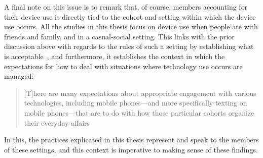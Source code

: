 A final note on this issue is to remark that, of course, members accounting for their device use is directly tied to the cohort and setting within which the device use occurs.
All the studies in this thesis focus on device use when people are with friends and family, and in a casual-social setting.
This links with the prior discussion above with regards to the rules of such a setting by establishing what is acceptable~\citep{Laurier2001}, and furthermore, it establishes the context in which the expectations for how to deal with situations where technology use occurs are managed:
\begin{quote}
    [T]here are many expectations about appropriate engagement with various technologies, including mobile phones---and more specifically texting on mobile phones---that are to do with how those particular cohorts organize their everyday affairs
\end{quote}
In this, the practices explicated in this thesis represent and speak to the members of these settings, and this context is imperative to making sense of these findings.


